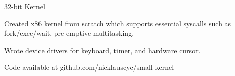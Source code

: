 
\vspace{-3.5mm}

\begin{cventries}

    \begin{multicols}{2}
  \cventry
    {} %
    {32-bit Kernel} %
    {} %
    {} %
    {
      \begin{cvitems} %
        \item {Created x86 kernel from scratch which supports essential syscalls
          such as fork/exec/wait, pre-emptive multitasking.
        \item Wrote device drivers for keyboard, timer, and hardware cursor.}
        \item {Code available at github.com/nicklauscyc/small-kernel}
      \end{cvitems}
    }




\end{multicols}
\end{cventries}
